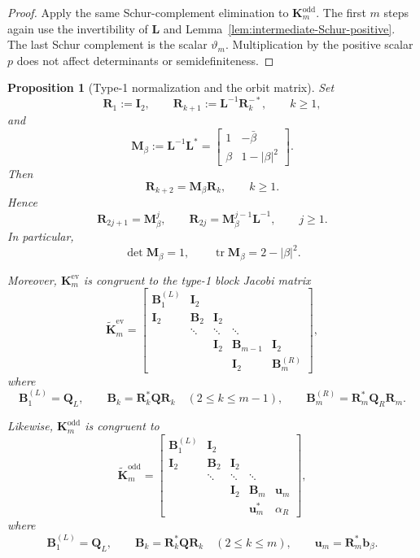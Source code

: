 \documentclass[11pt]{article}
\newtheorem{proposition}[theorem]{Proposition}
\begin{document}
\begin{proof}
Apply the same Schur-complement elimination to \(\mathbf{K}_m^{\mathrm{odd}}\). The first \(m\) steps again use the invertibility of \(\mathbf{L}\) and Lemma~\ref{lem:intermediate-Schur-positive}. The last Schur complement is the scalar \(\vartheta_m\). Multiplication by the positive scalar \(p\) does not affect determinants or semidefiniteness.
\end{proof}

\begin{proposition}[Type-1 normalization and the orbit matrix]\label{prop:type-1-normalization}
Set
\[
\mathbf{R}_1:=\mathbf{I}_2,
\qquad
\mathbf{R}_{k+1}:=\mathbf{L}^{-1}\mathbf{R}_k^{-*},
\qquad k\ge 1,
\]
and
\[
\mathbf{M}_\beta:=\mathbf{L}^{-1}\mathbf{L}^*
=
\begin{bmatrix}
1&-\bar\beta\\
\beta&1-|\beta|^2
\end{bmatrix}.
\]
Then
\[
\mathbf{R}_{k+2}=\mathbf{M}_\beta \mathbf{R}_k,
\qquad k\ge 1.
\]
Hence
\[
\mathbf{R}_{2j+1}=\mathbf{M}_\beta^j,
\qquad
\mathbf{R}_{2j}=\mathbf{M}_\beta^{j-1}\mathbf{L}^{-1},
\qquad j\ge 1.
\]
In particular,
\[
\det \mathbf{M}_\beta=1,
\qquad
\operatorname{tr}\mathbf{M}_\beta=2-|\beta|^2.
\]

Moreover, \(\mathbf{K}_m^{\mathrm{ev}}\) is congruent to the type-1 block Jacobi matrix
\[
\widetilde{\mathbf{K}}_m^{\mathrm{ev}}=
\begin{bmatrix}
\mathbf{B}_1^{(L)} & \mathbf{I}_2 \\
\mathbf{I}_2 & \mathbf{B}_2 & \mathbf{I}_2 \\
& \ddots & \ddots & \ddots \\
&& \mathbf{I}_2 & \mathbf{B}_{m-1} & \mathbf{I}_2 \\
&&& \mathbf{I}_2 & \mathbf{B}_m^{(R)}
\end{bmatrix},
\]
where
\[
\mathbf{B}_1^{(L)}=\mathbf{Q}_L,
\qquad
\mathbf{B}_k=\mathbf{R}_k^*\mathbf{Q}\mathbf{R}_k\quad (2\le k\le m-1),
\qquad
\mathbf{B}_m^{(R)}=\mathbf{R}_m^*\mathbf{Q}_R\mathbf{R}_m.
\]

Likewise, \(\mathbf{K}_m^{\mathrm{odd}}\) is congruent to
\[
\widetilde{\mathbf{K}}_m^{\mathrm{odd}}=
\begin{bmatrix}
\mathbf{B}_1^{(L)} & \mathbf{I}_2 \\
\mathbf{I}_2 & \mathbf{B}_2 & \mathbf{I}_2 \\
& \ddots & \ddots & \ddots \\
&& \mathbf{I}_2 & \mathbf{B}_m & \mathbf{u}_m \\
&&& \mathbf{u}_m^* & \alpha_R
\end{bmatrix},
\]
where
\[
\mathbf{B}_1^{(L)}=\mathbf{Q}_L,
\qquad
\mathbf{B}_k=\mathbf{R}_k^*\mathbf{Q}\mathbf{R}_k\quad (2\le k\le m),
\qquad
\mathbf{u}_m=\mathbf{R}_m^*\mathbf{b}_\beta.
\]
\end{proposition}
\end{document}
